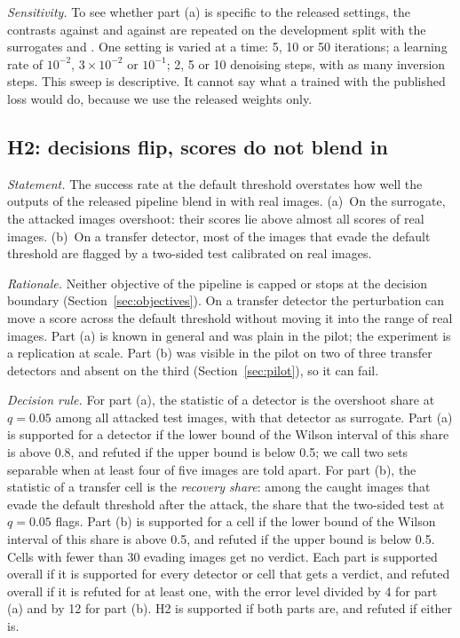 \emph{Sensitivity.} To see whether part (a) is specific to the released settings, the contrasts
 against  and  against  are repeated on the development split with
the surrogates \detE and \detS. One setting is varied at a time: 5, 10 or 50 iterations; a
learning rate of $10^{-2}$, $3\times10^{-2}$ or $10^{-1}$; 2, 5 or 10 denoising steps, with as many
inversion steps. This sweep is descriptive. It cannot say what a \CVAE trained with the published
loss would do, because we use the released weights only.

\subsection{H2: decisions flip, scores do not blend in}
\label{sec:h2}

\emph{Statement.} The success rate at the default threshold overstates how well the outputs of the
released pipeline blend in with real images. (a)~On the surrogate, the attacked images overshoot:
their scores lie above almost all scores of real images. (b)~On a transfer detector, most of the
images that evade the default threshold are flagged by a two-sided test calibrated on real images.

\emph{Rationale.} Neither objective of the pipeline is capped or stops at the decision boundary
(Section~\ref{sec:objectives}). On a transfer detector the perturbation can move a score across the
default threshold without moving it into the range of real images. Part (a) is known in general
 and was plain in the pilot; the experiment is a replication at
scale. Part (b) was visible in the pilot on two of three transfer detectors and absent on the
third (Section~\ref{sec:pilot}), so it can fail.

\emph{Decision rule.} For part (a), the statistic of a detector is the overshoot share at
$q=0.05$ among all attacked test images, with that detector as surrogate. Part (a) is supported
for a detector if the lower bound of the Wilson interval of this share is above 0.8, and refuted
if the upper bound is below 0.5; we call two sets separable when at least four of five images are
told apart. For part (b), the statistic of a transfer cell is the \emph{recovery share}: among the
caught images that evade the default threshold after the attack, the share that the two-sided test
at $q=0.05$ flags. Part (b) is supported for a cell if the lower bound of the Wilson interval of
this share is above 0.5, and refuted if the upper bound is below 0.5. Cells with fewer than 30
evading images get no verdict. Each part is supported overall if it is supported for every
detector or cell that gets a verdict, and refuted overall if it is refuted for at least one, with
the error level divided by 4 for part (a) and by 12 for part (b). H2 is supported if both parts
are, and refuted if either is.

